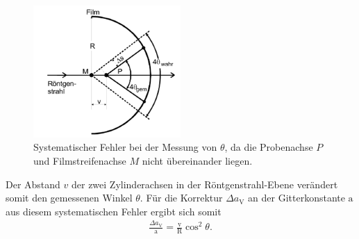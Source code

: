 \begin{figure}
  \centering
  \includegraphics[width=0.5\textwidth]{Syst_error_2.PNG}
  \caption{Systematischer Fehler bei
  der Messung von $\theta$, da die Probenachse $P$
   und Filmstreifenachse $M$ nicht übereinander liegen.}
  \label{fig:error2}
\end{figure}
Der Abstand $v$ der zwei Zylinderachsen in der Röntgenstrahl-Ebene
verändert somit den gemessenen Winkel $\theta$.
Für die Korrektur $\Delta a_{\mathrm{V}}$ an der Gitterkonstante $\mathrm{a}$
aus diesem systematischen Fehler ergibt sich somit
\begin{align}
  \frac{\Delta a_{\mathrm{V}}}{\mathrm{a}}=\frac{\mathrm{v}}{\mathrm{R}} \cos^2 \theta. \label{eqn:sys2}
\end{align}
